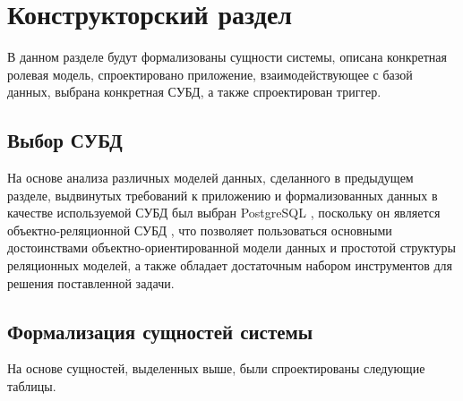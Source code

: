 \chapter{Конструкторский раздел}\label{sec:design}

В данном разделе будут формализованы сущности системы, описана конкретная ролевая модель, спроектировано приложение, взаимодействующее с базой данных, выбрана конкретная СУБД, а также спроектирован триггер.

\section{Выбор СУБД}

На основе анализа различных моделей данных, сделанного в предыдущем разделе, выдвинутых требований к приложению и формализованных данных в качестве используемой СУБД был выбран PostgreSQL \cite{postgres}, поскольку он является объектно-реляционной СУБД \cite{postgresdocs}, что позволяет пользоваться основными достоинствами объектно-ориентированной модели данных и простотой структуры реляционных моделей, а также обладает достаточным набором инструментов для решения поставленной задачи.

\section{Формализация сущностей системы}

На основе сущностей, выделенных выше, были спроектированы следующие таблицы.

